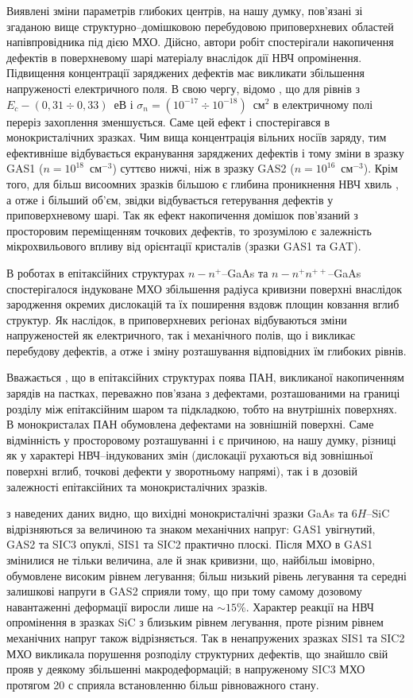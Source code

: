 \documentclass[a4paper,14pt,oneside,openany]{memoir}
\begin{document}
Виявлені зміни параметрів глибоких центрів, на нашу думку, пов'язані зі згаданою вище структурно--домішковою перебудовою приповерхневих областей напівпровідника під дією МХО.
Дійсно, автори робіт \cite{Boltovets,Belyaev1998JTFr,Konakova2015} спостерігали накопичення дефектів в поверхневому шарі матеріалу внаслідок дії НВЧ опромінення.
Підвищення концентрації заряджених дефектів має викликати збільшення напруженості електричного поля.
В свою чергу, відомо \cite{Shishiyanu}, що для рівнів з $E_c-(0,31\div0,33)$~еВ і $\sigma_n=(10^{-17}\div10^{-18})$~см$^2$ в електричному полі переріз захоплення зменшується.
Саме цей ефект і спостерігався в монокристалічних зразках.
Чим вища концентрація вільних носіїв заряду, тим ефективніше відбувається екранування заряджених дефектів і тому зміни в зразку GAS1 ($n=10^{18}$~см$^{-3}$) суттєво нижчі, ніж в зразку GAS2 ($n=10^{16}$~см$^{-3}$).
Крім того, для більш висоомних зразків більшою є глибина проникнення НВЧ хвиль \cite{ZOHM2000}, а отже і більший об'єм, звідки відбувається гетерування дефектів у приповерхневому шарі.
Так як ефект накопичення домішок пов'язаний з просторовим переміщенням точкових дефектів, то зрозумілою є залежність
мікрохвильового впливу від орієнтації кристалів (зразки GAS1 та GAT).

В роботах \cite{Boltovets,Konakova2012FTP} в епітаксійних структурах $n-n^+$--GaAs та $n-n^+n^{++}$--GaAs спостерігалося індуковане МХО збільшення радіуса кривизни поверхні внаслідок зародження окремих дислокацій та їх поширення вздовж площин ковзання вглиб структур.
Як наслідок, в приповерхневих регіонах відбуваються зміни напруженостей як електричного, так і механічного полів,
що і викликає перебудову дефектів, а отже і зміну розташування відповідних їм глибоких рівнів.

Вважається \cite{Saiko1993,OlikhSSC,OstrovPAN}, що в епітаксійних структурах поява ПАН, викликаної накопиченням зарядів на пастках, переважно пов'язана з дефектами, розташованими на границі розділу між епітаксійним шаром та підкладкою,
тобто на внутрішніх поверхнях.
В монокристалах ПАН обумовлена дефектами на зовнішній поверхні.
Саме відмінність у просторовому розташуванні і є причиною, на нашу думку, різниці як у характері НВЧ--індукованих
змін (дислокації рухаються від зовнішньої поверхні вглиб, точкові дефекти у зворотньому напрямі),
так і в дозовій залежності епітаксійних та монокристалічних зразків.


з наведених даних видно, що вихідні монокристалічні зразки GaAs та 6$H$--SiC відрізняються за величиною та знаком
механічних напруг: GAS1 увігнутий, GAS2 та SIC3 опуклі, SIS1 та SIC2 практично плоскі.
Після МХО в GAS1 змінилися не тільки величина, але й знак кривизни, що, найбільш імовірно,
обумовлене високим рівнем легування;
більш низький рівень легування та середні залишкові напруги в GAS2 сприяли тому, що при тому самому дозовому навантаженні деформації виросли лише на $\sim15$\%.
Характер реакції на НВЧ опромінення в зразках SiC з близьким рівнем легування, проте різним рівнем механічних напруг
також відрізняється.
Так в ненапружених зразках SIS1 та SIC2 МХО викликала порушення розподілу структурних дефектів, що
знайшло свій прояв у деякому збільшенні макродеформацій;
в напруженому SIC3 МХО протягом 20 с сприяла встановленню більш рівноважного стану.
\end{document}
